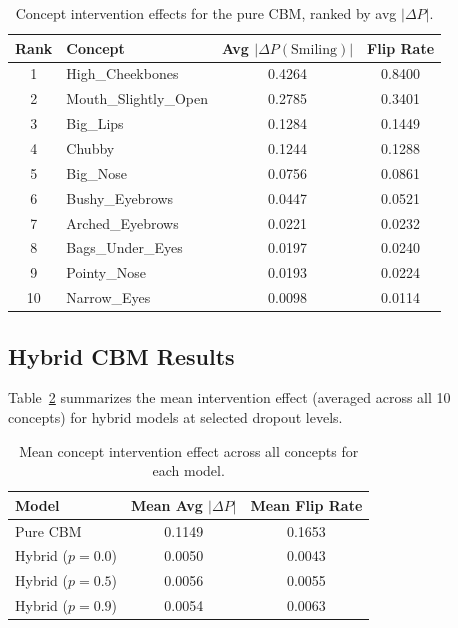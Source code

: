 \documentclass[11pt,a4paper]{article}
\begin{document}
\begin{table}[H]
\centering
\caption{Concept intervention effects for the pure CBM, ranked by avg $|\Delta P|$.}
\label{tab:cbm_intervention}
\begin{tabular}{clcc}
\toprule
\textbf{Rank} & \textbf{Concept} & \textbf{Avg $|\Delta P(\text{Smiling})|$} & \textbf{Flip Rate} \\
\midrule
1  & High\_Cheekbones       & 0.4264 & 0.8400 \\
2  & Mouth\_Slightly\_Open  & 0.2785 & 0.3401 \\
3  & Big\_Lips              & 0.1284 & 0.1449 \\
4  & Chubby                 & 0.1244 & 0.1288 \\
5  & Big\_Nose              & 0.0756 & 0.0861 \\
6  & Bushy\_Eyebrows        & 0.0447 & 0.0521 \\
7  & Arched\_Eyebrows       & 0.0221 & 0.0232 \\
8  & Bags\_Under\_Eyes       & 0.0197 & 0.0240 \\
9  & Pointy\_Nose           & 0.0193 & 0.0224 \\
10 & Narrow\_Eyes            & 0.0098 & 0.0114 \\
\bottomrule
\end{tabular}
\end{table}

\subsection{Hybrid CBM Results}

Table~\ref{tab:hybrid_intervention} summarizes the mean intervention effect (averaged across all 10 concepts) for hybrid models at selected dropout levels.

\begin{table}[H]
\centering
\caption{Mean concept intervention effect across all concepts for each model.}
\label{tab:hybrid_intervention}
\begin{tabular}{lcc}
\toprule
\textbf{Model} & \textbf{Mean Avg $|\Delta P|$} & \textbf{Mean Flip Rate} \\
\midrule
Pure CBM                     & 0.1149 & 0.1653 \\
Hybrid ($p = 0.0$)           & 0.0050 & 0.0043 \\
Hybrid ($p = 0.5$)           & 0.0056 & 0.0055 \\
Hybrid ($p = 0.9$)           & 0.0054 & 0.0063 \\
\bottomrule
\end{tabular}
\end{table}
\end{document}
